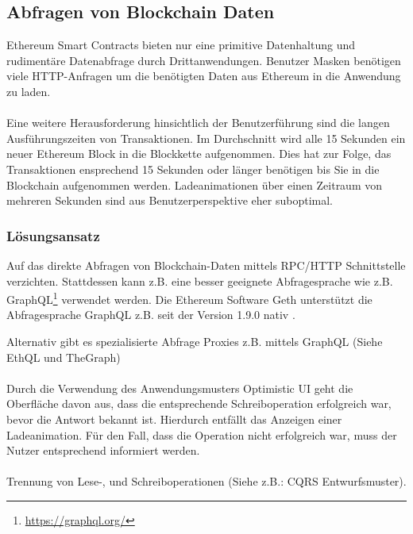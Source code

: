 \subsection*{Abfragen von Blockchain Daten}
Ethereum Smart Contracts bieten nur eine primitive Datenhaltung und rudimentäre Datenabfrage durch Drittanwendungen. 
Benutzer Masken benötigen viele HTTP-Anfragen um die benötigten Daten aus Ethereum in die Anwendung zu laden. 

\paragraph*{}
Eine weitere Herausforderung hinsichtlich der Benutzerführung sind die langen Ausführungszeiten von Transaktionen. Im Durchschnitt wird alle 15 Sekunden ein neuer Ethereum Block in die Blockkette aufgenommen. Dies hat zur Folge, das Transaktionen ensprechend 15 Sekunden oder länger benötigen bis Sie in die Blockchain aufgenommen werden. Ladeanimationen über einen Zeitraum von  mehreren Sekunden sind aus Benutzerperspektive eher suboptimal.

\subsubsection*{Lösungsansatz}

Auf das direkte Abfragen von Blockchain-Daten mittels RPC/HTTP Schnittstelle verzichten. Stattdessen kann z.B. eine besser geeignete Abfragesprache wie z.B. GraphQL\footnote{\url{https://graphql.org/}} verwendet werden. Die Ethereum Software Geth unterstützt die Abfragesprache GraphQL z.B. seit der Version 1.9.0 nativ \cite{geth}.

Alternativ gibt es spezialisierte Abfrage Proxies z.B. mittels GraphQL (Siehe EthQL und TheGraph)

\paragraph*{}
Durch die Verwendung des Anwendungsmusters Optimistic UI geht die Oberfläche davon aus, dass die entsprechende Schreiboperation erfolgreich war, bevor die Antwort bekannt ist. \cite{optimisticui} Hierdurch entfällt das Anzeigen einer Ladeanimation. Für den Fall, dass die Operation nicht erfolgreich war, muss der Nutzer entsprechend informiert werden.

\paragraph*{}
Trennung von Lese-, und Schreiboperationen (Siehe z.B.: CQRS Entwurfsmuster). 


